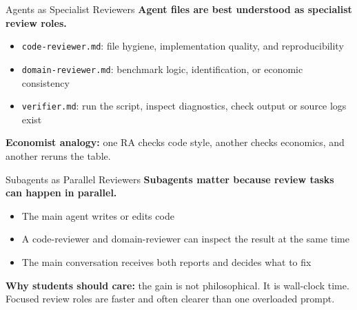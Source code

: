 \documentclass[10pt,english,aspectratio=169]{beamer}
\begin{document}
\begin{frame}{Agents as Specialist Reviewers}
\textbf{Agent files are best understood as specialist review roles.}

\vspace{0.25cm}

\begin{itemize}
    \item \texttt{code-reviewer.md}: file hygiene, implementation quality, and reproducibility
    \item \texttt{domain-reviewer.md}: benchmark logic, identification, or economic consistency
    \item \texttt{verifier.md}: run the script, inspect diagnostics, check output or source logs exist
\end{itemize}

\vspace{0.3cm}

\textbf{Economist analogy:} one RA checks code style, another checks economics, and another reruns the table.
\end{frame}

\begin{frame}{Subagents as Parallel Reviewers}
\textbf{Subagents matter because review tasks can happen in parallel.}

\vspace{0.25cm}

\begin{itemize}
    \item The main agent writes or edits code
    \item A code-reviewer and domain-reviewer can inspect the result at the same time
    \item The main conversation receives both reports and decides what to fix
\end{itemize}

\vspace{0.25cm}

\textbf{Why students should care:} the gain is not philosophical. It is wall-clock time. Focused review roles are faster and often clearer than one overloaded prompt.
\end{frame}
\end{document}

